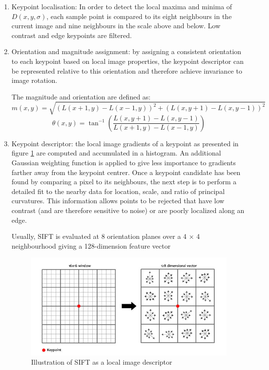 \begin{enumerate}
    \item Keypoint localisation: In order to detect the local maxima and minima of $D(x, y,\sigma)$, each sample point is compared to its eight neighbours in the current image and nine neighbours in the scale above and below. Low contrast and edge keypoints are filtered.
    
    \item Orientation and magnitude assignment: by assigning a consistent orientation to each keypoint based on local image properties, the keypoint descriptor can be represented relative to this orientation and therefore achieve invariance to image rotation.
    
    The magnitude and orientation are defined as:
    $$
    m(x, y) = \sqrt{ \left( L(x +1, y) - L(x -1, y)  \right)^2 + \left( L(x, y + 1) - L(x, y - 1) \right)^2}
    $$
    $$
    \theta(x, y) =\tan^{-1} ( \frac{L(x, y + 1) - L(x, y - 1 )}{L(x + 1, y) - L(x - 1, y)} )
    $$
    
    \item Keypoint descriptor: the local image gradients of a keypoint as presented in figure \ref{fig:sift_descriptor} are computed and accumulated in a histogram. An additional Gaussian weighting function is applied to give less importance to gradients farther away from the keypoint centrer. Once a keypoint candidate has been found by comparing a pixel to its neighbours, the next step is to perform a detailed fit to the nearby data for location, scale, and ratio of principal curvatures. This information allows points to be rejected that have low contrast (and are therefore sensitive to noise) or are poorly localized along an edge.
    
    Usually, SIFT is evaluated at 8 orientation planes over a 4 × 4 neighbourhood giving a
    128-dimension feature vector
    
    \begin{figure}[h]
        \centering
        \includegraphics[scale=0.5]{img/sift_descriptor.jpg}
        \caption{Illustration of SIFT as a local image descriptor}
        \label{fig:sift_descriptor}
    \end{figure}
\end{enumerate}

